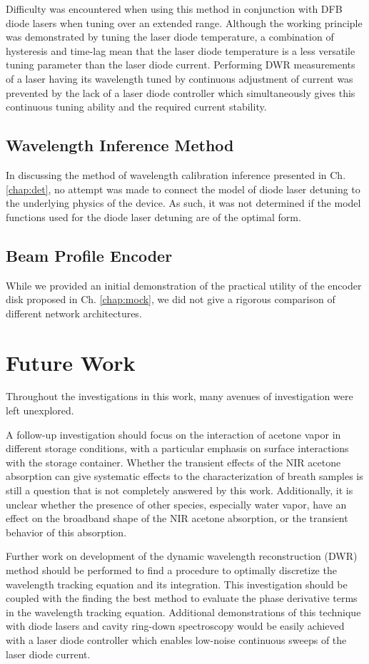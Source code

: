 \documentclass[12pt]{report}
\begin{document}
	Difficulty was encountered when using this method in conjunction with DFB diode lasers when tuning over an extended range. Although the working principle was demonstrated by tuning the laser diode temperature, a combination of hysteresis and time-lag mean that the laser diode temperature is a less versatile tuning parameter than the laser diode current. Performing DWR measurements of a laser having its wavelength tuned by continuous adjustment of current was prevented by the lack of a laser diode controller which simultaneously gives this continuous tuning ability and the required current stability.
	
	\subsection{Wavelength Inference Method}
	In discussing the method of wavelength calibration inference presented in Ch. \ref{chap:det}, no attempt was made to connect the model of diode laser detuning to the underlying physics of the device. As such, it was not determined if the model functions used for the diode laser detuning are of the optimal form.
	
	\subsection{Beam Profile Encoder}
	While we provided an initial demonstration of the practical utility of the encoder disk proposed in Ch. \ref{chap:mock}, we did not give a rigorous comparison of different network architectures. 
	
	\section{Future Work}
	Throughout the investigations in this work, many avenues of investigation were left unexplored.
	
	A follow-up investigation should focus on the interaction of acetone vapor in different storage conditions, with a particular emphasis on surface interactions with the storage container. Whether the transient effects of the NIR acetone absorption can give systematic effects to the characterization of breath samples is still a question that is not completely answered by this work. Additionally, it is unclear whether the presence of other species, especially water vapor, have an effect on the broadband shape of the NIR acetone absorption, or the transient behavior of this absorption.
	
	Further work on development of the dynamic wavelength reconstruction (DWR) method should be performed to find a procedure to optimally discretize the wavelength tracking equation and its integration. This investigation should be coupled with the finding the best method to evaluate the phase derivative terms in the wavelength tracking equation. Additional demonstrations of this technique with diode lasers and cavity ring-down spectroscopy would be easily achieved with a laser diode controller which enables low-noise continuous sweeps of the laser diode current.
	
\end{document}
